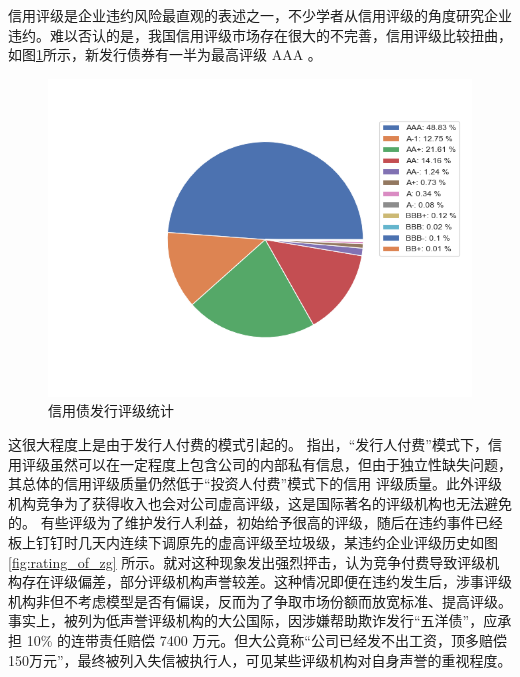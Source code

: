 信用评级是企业违约风险最直观的表述之一，不少学者从信用评级的角度研究企业违约。难以否认的是，我国信用评级市场存在很大的不完善，信用评级比较扭曲，如图\ref{fig:rating}所示，新发行债券有一半为最高评级 AAA 。
\begin{figure}[h]
	\centering
	\includegraphics[width=0.9\linewidth]{./data/rating_from_2014.png}
	\caption{\label{fig:rating}信用债发行评级统计}
\end{figure}
这很大程度上是由于发行人付费的模式引起的。\Textcite{吴育辉2020} 指出，“发行人付费”模式下，信用评级虽然可以在一定程度上包含公司的内部私有信息，但由于独立性缺失问题，其总体的信用评级质量仍然低于“投资人付费”模式下的信用 评级质量。此外评级机构竞争为了获得收入也会对公司虚高评级，这是国际著名的评级机构也无法避免的\Parencite{opp2013rating}。
有些评级为了维护发行人利益，初始给予很高的评级，随后在违约事件已经板上钉钉时几天内连续下调原先的虚高评级至垃圾级，某违约企业评级历史如图 \ref{fig:rating_of_zg}  所示。\Textcite{陈关亭2021多重信用评级与债券融资成本}就对这种现象发出强烈抨击，认为竞争付费导致评级机构存在评级偏差，部分评级机构声誉较差。这种情况即便在违约发生后，涉事评级机构非但不考虑模型是否有偏误，反而为了争取市场份额而放宽标准、提高评级\cite{黄小琳2017债券违约对涉事信用评级机构的影响}。
事实上，被\Textcite{王雄元2013声誉机制}列为低声誉评级机构的大公国际，因涉嫌帮助欺诈发行“五洋债”，应承担 10\% 的连带责任赔偿 7400 万元。但大公竟称“公司已经发不出工资，顶多赔偿150万元”，最终被列入失信被执行人，可见某些评级机构对自身声誉的重视程度。
